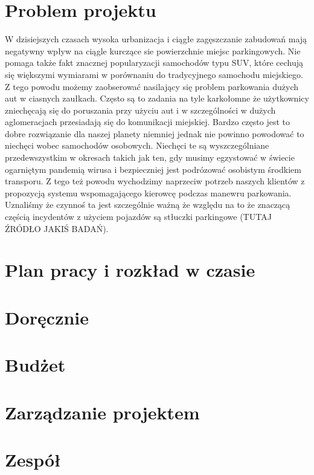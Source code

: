 \documentclass[12pt]{article}
\begin{document}


\tableofcontents

\clearpage
\section{Problem projektu}
W dzisiejszych czasach wysoka urbanizacja i ciągłe zagęszczanie zabudowań 
mają negatywny wpływ na ciągle kurczące sie powierzchnie miejsc parkingowych.
Nie pomaga także fakt znacznej popularyzacji samochodów typu SUV, które cechują się
większymi wymiarami w porównaniu do tradycyjnego samochodu miejskiego. 
Z tego powodu możemy zaobserować nasilający się problem parkowania dużych aut
w ciasnych zaułkach. Często są to zadania na tyle karkołomne że użytkownicy 
zniechęcają się do poruszania przy użyciu aut i w szczególności w dużych aglomeracjach
przesiadają się do komunikacji miejskiej. Bardzo często jest to dobre rozwiązanie
dla naszej planety niemniej jednak nie powinno powodować to niechęci wobec samochodów osobowych.
Niechęci te są wyszczególniane przedewszystkim w okresach takich jak ten,
gdy musimy egzystować w świecie ogarniętym pandemią wirusa i bezpieczniej jest
podrózować osobistym środkiem transporu. Z tego też powodu wychodzimy naprzeciw
potrzeb naszych klientów z propozycją systemu wspomagającego kierowcę podczas manewru
parkowania. Uznaliśmy że czynnoś ta jest szczególnie ważną że względu na to że znaczącą
częścią incydentów z użyciem pojazdów są stłuczki parkingowe (TUTAJ ŹRÓDŁO JAKIŚ BADAŃ).

\section{Plan pracy i rozkład w czasie}
\newpage
\section{Doręcznie}
\section{Budżet}
\newpage
\section{Zarządzanie projektem}
\section{Zespół}
\end{document}
